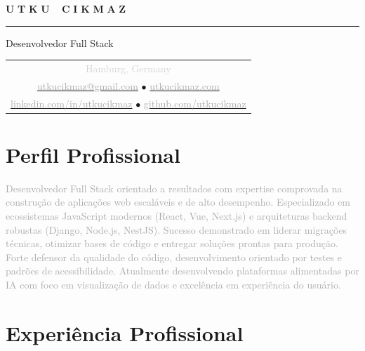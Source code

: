 \documentclass[10pt,a4paper]{article}
\newcommand{\gradientname}[1]{%
  \textcolor{darkgray!90}{\Huge\bfseries U}%
  \textcolor{darkgray!80}{\Huge\bfseries T}%
  \textcolor{darkgray!70}{\Huge\bfseries K}%
  \textcolor{darkgray!60}{\Huge\bfseries U}%
  \textcolor{mediumgray!90}{\Huge\bfseries\ }%
  \textcolor{mediumgray!80}{\Huge\bfseries C}%
  \textcolor{mediumgray!70}{\Huge\bfseries I}%
  \textcolor{mediumgray!60}{\Huge\bfseries K}%
  \textcolor{mediumgray!50}{\Huge\bfseries M}%
  \textcolor{lightgray!80}{\Huge\bfseries A}%
  \textcolor{lightgray!70}{\Huge\bfseries Z}%
}
\begin{document}
\color{black}
\pagestyle{empty}

\begin{center}
  \vspace{-3pt}
  \gradientname{UTKU CIKMAZ}
  
  \vspace{4pt}
  \textcolor{verylightgray}{\rule{0.35\textwidth}{0.6pt}}
  
  \vspace{4pt}
  {\large\color{mediumgray}Desenvolvedor Full Stack}
  
  \vspace{5pt}
  \begin{tabular}{c}
    \textcolor{lightgray}{\small Hamburg, Germany} \\[2pt]
    \href{mailto:utkucikmaz@gmail.com}{\textcolor{darkgray}{utkucikmaz@gmail.com}} \quad
    \textcolor{verylightgray}{$\bullet$} \quad
    \href{https://www.utkucikmaz.com}{\textcolor{darkgray}{utkucikmaz.com}} \\[1pt]
    \href{https://linkedin.com/in/utkucikmaz}{\textcolor{darkgray}{linkedin.com/in/utkucikmaz}} \quad
    \textcolor{verylightgray}{$\bullet$} \quad
    \href{https://github.com/utkucikmaz}{\textcolor{darkgray}{github.com/utkucikmaz}}
  \end{tabular}
\end{center}

\vspace{1pt}

\section*{Perfil Profissional}
\vspace{0pt}
\textcolor{darkgray}{%
Desenvolvedor Full Stack orientado a resultados com expertise comprovada na construção de aplicações web escaláveis e de alto desempenho. Especializado em ecossistemas JavaScript modernos (React, Vue, Next.js) e arquiteturas backend robustas (Django, Node.js, NestJS). Sucesso demonstrado em liderar migrações técnicas, otimizar bases de código e entregar soluções prontas para produção. Forte defensor da qualidade do código, desenvolvimento orientado por testes e padrões de acessibilidade. Atualmente desenvolvendo plataformas alimentadas por IA com foco em visualização de dados e excelência em experiência do usuário.
}
\vspace{1pt}

\section*{Experiência Profissional}
\end{document}
